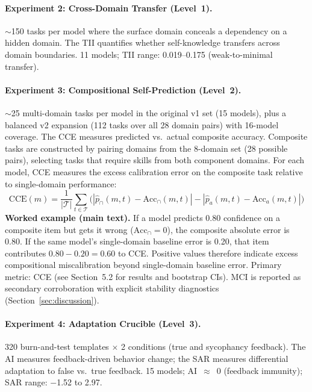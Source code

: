 \documentclass[10pt]{article}
\newcommand{\MCI}{MCI}
\newcommand{\CCE}{CCE}
\newcommand{\TII}{TII}
\newcommand{\SAR}{SAR}
\newcommand{\AI}{AI}
\begin{document}
\paragraph{Experiment 2: Cross-Domain Transfer (Level~1).}
${\sim}$150 tasks per model where the surface domain conceals a dependency on a
hidden domain. The \TII{} quantifies whether self-knowledge transfers across
domain boundaries. 11 models; \TII{} range: 0.019--0.175 (weak-to-minimal transfer).

\paragraph{Experiment 3: Compositional Self-Prediction (Level~2).}
${\sim}$25 multi-domain tasks per model in the original v1 set (15 models), plus a balanced v2 expansion (112 tasks over all 28 domain pairs) with 16-model coverage. The \CCE{} measures predicted vs.\ actual composite accuracy. Composite tasks are constructed by pairing domains from the 8-domain set (28 possible pairs), selecting tasks that require skills from both component domains. For each model, \CCE{} measures the excess calibration error on the composite task relative to single-domain performance:
\begin{equation}
\text{CCE}(m) = \frac{1}{|\mathcal{T}|} \sum_{t \in \mathcal{T}} \bigl(|\hat{p}_{\cap}(m,t) - \text{Acc}_{\cap}(m,t)| - |\hat{p}_{a}(m,t) - \text{Acc}_{a}(m,t)|\bigr)
\label{eq:cce-main}
\end{equation}
\textbf{Worked example (main text).} If a model predicts 0.80 confidence on a composite item but gets it wrong ($\text{Acc}_{\cap}=0$), the composite absolute error is 0.80. If the same model's single-domain baseline error is 0.20, that item contributes $0.80 - 0.20 = 0.60$ to \CCE{}. Positive values therefore indicate excess compositional miscalibration beyond single-domain baseline error. Primary metric: \CCE{} (see Section~5.2 for results and bootstrap CIs). \MCI{} is reported as secondary corroboration with explicit stability diagnostics (Section~\ref{sec:discussion}).

\paragraph{Experiment 4: Adaptation Crucible (Level~3).}
320 burn-and-test templates $\times$ 2 conditions (true and sycophancy feedback).
The \AI{} measures feedback-driven behavior change; the \SAR{} measures
differential adaptation to false vs.\ true feedback. 15 models; \AI{}~$\approx$~0
(feedback immunity); \SAR{} range: $-$1.52 to 2.97.
\end{document}
